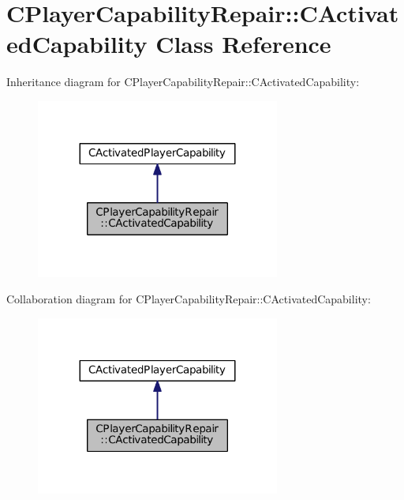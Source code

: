 \hypertarget{classCPlayerCapabilityRepair_1_1CActivatedCapability}{}\section{C\+Player\+Capability\+Repair\+:\+:C\+Activated\+Capability Class Reference}
\label{classCPlayerCapabilityRepair_1_1CActivatedCapability}


Inheritance diagram for C\+Player\+Capability\+Repair\+:\+:C\+Activated\+Capability\+:
\nopagebreak
\begin{figure}[H]
\begin{center}
\leavevmode
\includegraphics[width=227pt]{classCPlayerCapabilityRepair_1_1CActivatedCapability__inherit__graph}
\end{center}
\end{figure}


Collaboration diagram for C\+Player\+Capability\+Repair\+:\+:C\+Activated\+Capability\+:
\nopagebreak
\begin{figure}[H]
\begin{center}
\leavevmode
\includegraphics[width=227pt]{classCPlayerCapabilityRepair_1_1CActivatedCapability__coll__graph}
\end{center}
\end{figure}
